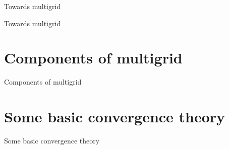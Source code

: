 \documentclass[18pt,xcolor=table]{beamer}
\begin{document}
\begin{frame}{Towards multigrid}
\begin{block}{}
\bit
\item
\eit
\end{block}
\end{frame}

\begin{frame}{Towards multigrid}
\begin{block}{}
\bit
\item
\eit
\end{block}
\end{frame}



\section{Components of multigrid}

\begin{frame}{Components of multigrid}
\begin{block}{}
\bit
\item
\eit
\end{block}
\end{frame}



\section{Some basic convergence theory}

\begin{frame}{Some basic convergence theory}
\begin{block}{}
\bit
\item
\eit
\end{block}
\end{frame}
\end{document}
